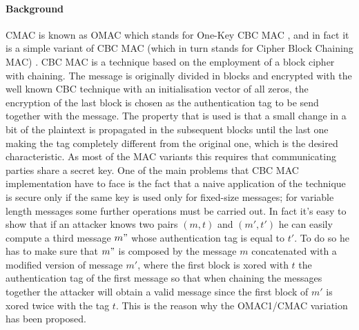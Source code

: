 \documentclass[11pt]{article}
\begin{document}
\paragraph*{Background}
CMAC is known as OMAC which stands for One-Key CBC MAC \cite{omac}, and in fact it is a simple variant of CBC MAC (which in turn stands for Cipher Block Chaining MAC) \cite{cbcmac}. CBC MAC is a technique based on the employment of a block cipher with chaining. The message is originally divided in blocks and encrypted with the well known CBC technique with an initialisation vector of all zeros, the encryption of the last block is chosen as the authentication tag to be send together with the message. The property that is used is that a small change in a bit of the plaintext is propagated in the subsequent blocks until the last one making the tag completely different from the original one, which is the desired characteristic. As most of the MAC variants this requires that communicating parties share a secret key. One of the main problems that CBC MAC implementation have to face is the fact that a naive application of the technique is secure only if the same key is used only for fixed-size messages; for variable length messages some further operations must be carried out. In fact it's easy to show that if an attacker knows two pairs $(m, t)$ and $(m',t')$ he can easily compute a third message $m"$ whose authentication tag is equal to $t'$. To do so he has to make sure that $m"$ is composed by the message $m$ concatenated with a modified version of message $m'$, where the first block is xored with $t$ the authentication tag of the first message so that when chaining the messages together the attacker will obtain a valid message since the first block of $m'$ is xored twice with the tag $t$.
This is the reason why the OMAC1/CMAC variation has been proposed.
\end{document}
